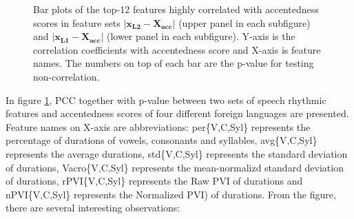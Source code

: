 \begin{figure}[]
\begin{minipage}[t]{0.5\linewidth}
        \end{minipage}%
        \caption{Bar plots of the top-12 features highly correlated with accentedness scores in feature sets $\left| \mathbf{x_{L2}}-\mathbf{X_{acc}} \right|$ (upper panel in each subfigure) and $\left| \mathbf{x_{L1}}- \mathbf{X_{acc}} \right|$ (lower panel in each subfigure). Y-axis is the correlation coefficients with accentedness score and X-axis is feature names. The numbers on top of each bar are the p-value for testing non-correlation.}
        \centering
        \label{fig:supraseg_bar}
     \end{figure}

In figure \ref{fig:supraseg_bar}, PCC together with p-value between two sets of speech rhythmic features and accentedness scores of four different foreign languages are presented. Feature names on X-axis are abbreviations: per\{V,C,Syl\} represents the percentage of durations of vowels, consonants and syllables, avg\{V,C,Syl\} represents the average durations, std\{V,C,Syl\} represents the standard deviation of durations, Vacro\{V,C,Syl\} represents the mean-normalizd standard deviation of durations, rPVI\{V,C,Syl\} represents the Raw PVI of durations and nPVI\{V,C,Syl\} represents the Normalized PVI) of durations. From the figure, there are several interesting observations:

